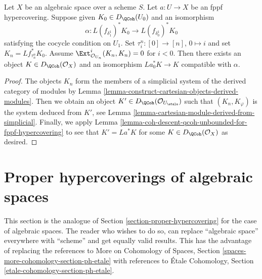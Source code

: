 \begin{lemma}
\label{lemma-fppf-glue-neg-ext-zero}
Let $X$ be an algebraic space over a scheme $S$.
Let $a : U \to X$ be an fppf hypercovering.
Suppose given $K_0 \in D_\QCoh(U_0)$ and an isomorphism
$$
\alpha :
L(f_{\delta_1^1})^*K_0
\longrightarrow
L(f_{\delta_0^1})^*K_0
$$
satisfying the cocycle condition on $U_1$. Set
$\tau^n_i : [0] \to [n]$, $0 \mapsto i$ and
set $K_n = Lf_{\tau^n_n}^*K_0$.
Assume $\Ext^i_{\mathcal{O}_{U_n}}(K_n, K_n) = 0$ for $i < 0$.
Then there exists an object $K \in D_\QCoh(\mathcal{O}_X)$
and an isomorphism $La_0^*K \to K$ compatible with $\alpha$.
\end{lemma}

\begin{proof}
The objects $K_n$ form the members of a  simplicial system of the
derived category of modules by
Lemma \ref{lemma-construct-cartesian-objects-derived-modules}.
Then we obtain an object
$K' \in D_\QCoh(\mathcal{O}_{U_\etale})$
such that $(K_n, K_\varphi)$ is the system deduced from $K'$, see
Lemma \ref{lemma-cartesian-module-derived-from-simplicial}.
Finally, we apply
Lemma \ref{lemma-coh-descent-qcoh-unbounded-for-fppf-hypercovering}
to see that $K' = La^*K$ for some $K \in D_\QCoh(\mathcal{O}_X)$
as desired.
\end{proof}











\section{Proper hypercoverings of algebraic spaces}
\label{section-proper-hypercovering-spaces}

\noindent
This section is the analogue of Section \ref{section-proper-hypercovering}
for the case of algebraic spaces.
The reader who wishes to do so, can replace ``algebraic space''
everywhere with ``scheme'' and get equally valid results.
This has the advantage of replacing the references to
More on Cohomology of Spaces, Section
\ref{spaces-more-cohomology-section-ph-etale}
with references to
\'Etale Cohomology, Section \ref{etale-cohomology-section-ph-etale}.

